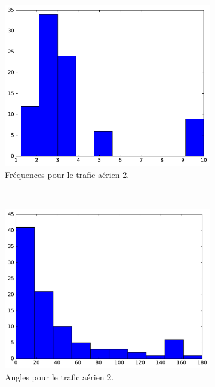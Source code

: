 \begin{figure}
\begin{subfigure}[t]{\subImgWaStats}
			\includegraphics[width=\textwidth]{figures/ch3/germanwingsA_frequency}
			\caption{Fréquences pour le trafic aérien 2.}
			\label{fig:germanwingsA_frequency}
		\end{subfigure}
		~
		\begin{subfigure}[t]{\subImgWaStats}
			\centering
			\includegraphics[width=\textwidth]{figures/ch3/germanwingsA_angle}
			\caption{Angles pour le trafic aérien 2.}
			\label{fig:germanwingsA_angle}
		\end{subfigure}
		\caption[Histogrammes, contrôle du trafic aérien]{}
		\label{fig:histAirControl12}
	\end{figure}
	
